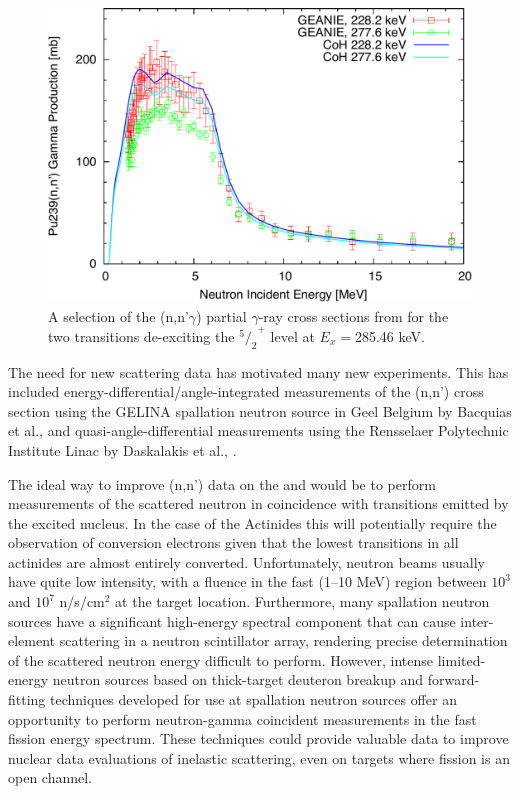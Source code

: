 \documentclass[letterpaper]{ar-1col}
\begin{document}
\begin{figure}[t]
 \centering
 \includegraphics[width=0.6\linewidth]{239pu_nn_cropped.pdf}

 \caption{A selection of the (n,n'$\gamma$) partial $\gamma$-ray cross sections from \cite{Ber00} for the two transitions de-exciting the ${^5/_2}^{+}$ level at $E_x=$285.46 keV.}
 \label{fig:239pu_nn_cropped}
\end{figure}


The need for new scattering data has motivated many new experiments.
 This has included energy-differential/angle-integrated measurements of the (n,n') cross section using the GELINA spallation neutron source in Geel Belgium by Bacquias et al., \cite{Nem13} and quasi-angle-differential measurements using the Rensselaer Polytechnic Institute Linac by Daskalakis et al., \cite{Das14}.


The ideal way to improve (n,n') data on the  and  would be to perform measurements of the scattered neutron in coincidence with transitions emitted by the excited nucleus.
 In the case of the Actinides this will potentially require the observation of conversion electrons given that the lowest transitions in all actinides are almost entirely converted.
 Unfortunately, neutron beams usually have quite low intensity, with a fluence in the fast (1--10 MeV) region between $10^3$ and $10^7$ n/s/cm$^2$ at the target location.
 Furthermore, many spallation neutron sources have a significant high-energy spectral component that can cause inter-element scattering in a neutron scintillator array, rendering precise determination of the scattered neutron energy difficult to  perform.
However, intense limited-energy neutron sources based on thick-target deuteron breakup \cite{Harrig2018} and forward-fitting techniques developed for use at spallation neutron sources \cite{Kee18} offer an opportunity to perform neutron-gamma coincident measurements in the fast fission energy spectrum.
 These techniques could provide valuable data to improve nuclear data evaluations of inelastic scattering, even on targets where fission is an open channel.
\end{document}
